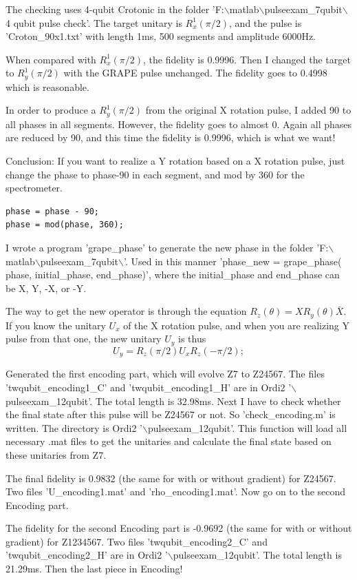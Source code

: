 \documentclass[prl,onecolumn]{revtex4-1}
\newcommand{\dir}{$\backslash$}
\newcommand{\be}{\begin{equation}}
\newcommand{\ee}{\end{equation}}
\begin{document}
The checking uses 4-qubit Crotonic in the folder 'F:\dir matlab\dir pulseexam\_7qubit\dir 4 qubit pulse check'. The target unitary is $R_x^1(\pi/2)$, and the pulse is 'Croton\_90x1.txt' with length 1ms, 500 segments and amplitude 6000Hz.

When compared with $R_x^1(\pi/2)$, the fidelity is 0.9996. Then I changed the target to $R_y^1(\pi/2)$ with the GRAPE pulse unchanged. The fidelity goes to 0.4998 which is reasonable.

In order to produce a $R_y^1(\pi/2)$ from the original X rotation pulse, I added 90 to all phases in all segments. However, the fidelity goes to almost 0. Again all phases are reduced by 90, and this time the fidelity is 0.9996, which is what we want!

Conclusion: If you want to realize a Y rotation based on a X rotation pulse, just change the phase to phase-90 in each segment, and mod by 360 for the spectrometer.
\begin{lstlisting}
phase = phase - 90;
phase = mod(phase, 360);
\end{lstlisting}
I wrote a program 'grape\_phase' to generate the new phase in the folder 'F:\dir matlab\dir pulseexam\_7qubit\dir'. Used in this manner  'phase\_new = grape\_phase( phase, initial\_phase, end\_phase)', where the initial\_phase and end\_phase can be X, Y, -X, or -Y.

The way to get the new operator is through the equation $R_z(\theta) = XR_y(\theta)\bar{X}$. If you know the unitary $U_x$ of the X rotation pulse, and when you are realizing Y pulse from that one, the new unitary $U_y$ is thus
\be
U_y = R_z(\pi/2)U_xR_z(-\pi/2);
\ee

Generated the first encoding part, which will evolve Z7 to Z24567. The files 'twqubit\_encoding1\_C' and 'twqubit\_encoding1\_H' are in Ordi2 '\dir pulseexam\_12qubit'. The total length is 32.98ms. Next I have to check whether the final state after this pulse will be Z24567 or not. So 'check\_encoding.m' is written. The directory is Ordi2 '\dir pulseexam\_12qubit'. This function will load all necessary .mat files to get the unitaries and calculate the final state based on these unitaries from Z7.

The final fidelity is 0.9832 (the same for with or without gradient) for Z24567. Two files 'U\_encoding1.mat' and 'rho\_encoding1.mat'. Now go on to the second Encoding part.

The fidelity for the second Encoding part is -0.9692 (the same for with or without gradient) for Z1234567. Two files 'twqubit\_encoding2\_C' and 'twqubit\_encoding2\_H' are in Ordi2 '\dir pulseexam\_12qubit'. The total length is 21.29ms. Then the last piece in Encoding!
\end{document}
